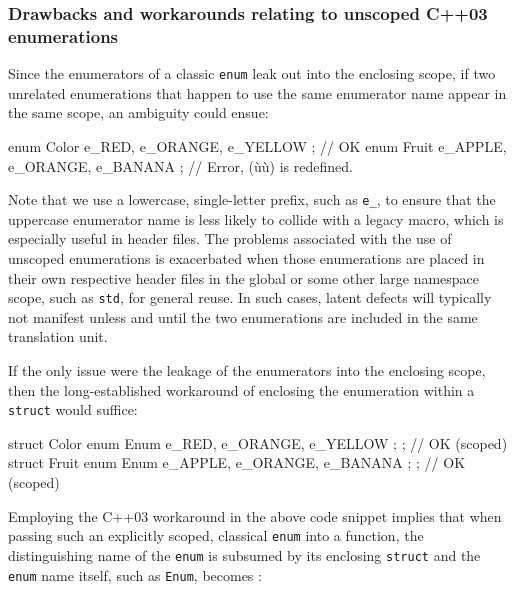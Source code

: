 \subsubsection[Drawbacks and workarounds relating to unscoped C++03 enumerations]{Drawbacks and workarounds relating to unscoped C++03 enumerations}\label{drawbacks-and-workarounds-relating-to-unscoped-c++03-enumerations}

Since the enumerators of a classic \lstinline!enum! leak out into the
enclosing scope, if two unrelated enumerations that happen to use the
same enumerator name appear in the same scope, an ambiguity could ensue:

\begin{emcppslisting}
enum Color { e_RED, e_ORANGE, e_YELLOW };    // OK
enum Fruit { e_APPLE, e_ORANGE, e_BANANA };  // Error, (ù{}ù) is redefined.
\end{emcppslisting}

\noindent Note that
we use a lowercase, single-letter prefix, such as \lstinline!e_!, to
ensure that the uppercase enumerator name is less likely to collide
  with a legacy macro, which is especially useful in header files. The problems associated with the use of unscoped enumerations is
exacerbated when those enumerations are placed in their own respective
header files in the global or some other large namespace scope, such as
\lstinline!std!, for general reuse. In such cases, latent defects will
typically not manifest unless and until the two enumerations are
included in the same translation unit.

If the only issue were the leakage of the enumerators into the enclosing
scope, then the long-established workaround of enclosing the enumeration
within a \lstinline!struct! would suffice:

\begin{emcppslisting}[emcppsbatch=e1]
struct Color { enum Enum { e_RED, e_ORANGE, e_YELLOW };  };   // OK (scoped)
struct Fruit { enum Enum { e_APPLE, e_ORANGE, e_BANANA }; };  // OK (scoped)
\end{emcppslisting}

\noindent Employing the C++03 workaround in the above code snippet implies that
when passing such an explicitly scoped, classical \lstinline!enum! into a
function, the distinguishing name of the \lstinline!enum! is subsumed by
its enclosing \lstinline!struct! and the \lstinline!enum! name itself, such as
\lstinline!Enum!, becomes :

